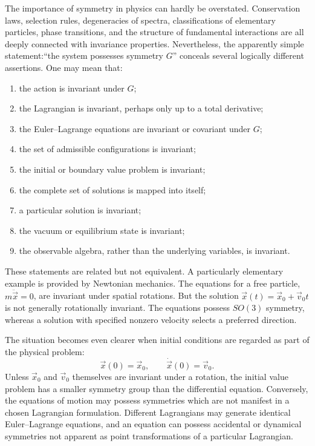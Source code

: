 The importance of symmetry in physics can hardly be overstated.  Conservation
laws, selection rules, degeneracies of spectra, classifications of elementary
particles, phase transitions, and the structure of fundamental interactions are
all deeply connected with invariance properties.
Nevertheless, the apparently simple statement:``the system possesses symmetry $G$''
conceals several logically different assertions.
One may mean that:
\begin{enumerate}
\item the action is invariant under $G$;
\item the Lagrangian is invariant, perhaps only up to a total derivative;
\item the Euler--Lagrange equations are invariant or covariant under $G$;
\item the set of admissible configurations is invariant;
\item the initial or boundary value problem is invariant;
\item the complete set of solutions is mapped into itself;
\item a particular solution is invariant;
\item the vacuum or equilibrium state is invariant;
\item the observable algebra, rather than the underlying variables, is invariant.
\end{enumerate}
These statements are related but not equivalent.
A particularly elementary example is provided by Newtonian mechanics.  The
equations for a free particle,$m \ddot{\vec x}=0$,
are invariant under spatial rotations.  But the solution
$\vec{x}(t)=\vec{x}_0+\vec{v}_0 t$ 
is not generally rotationally invariant.  The equations possess $SO(3)$
symmetry, whereas a solution with specified nonzero velocity selects a
preferred direction.

The situation becomes even clearer when initial conditions are regarded as part
of the physical problem:
\[\vec{x}(0)=\vec{x}_0,\qquad \dot{\vec{x}}(0)=\vec{v}_0.\]
Unless $\vec{x}_0$ and $\vec{v}_0$ themselves are invariant under a rotation,
the initial value problem has a smaller symmetry group than the differential
equation.
Conversely, the equations of motion may possess symmetries which are not
manifest in a chosen Lagrangian formulation.  Different Lagrangians may
generate identical Euler--Lagrange equations, and an equation can possess
accidental or dynamical symmetries not apparent as point transformations of a
particular Lagrangian.

